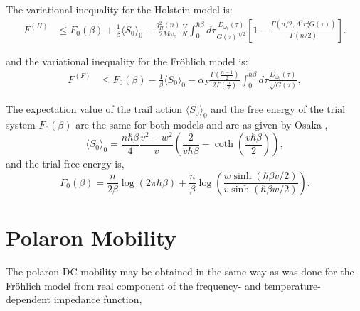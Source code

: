The variational inequality for the Holstein model is:
\begin{equation}
    \begin{aligned}
        F^{(H)} &\leq F_0(\beta) + \frac{1}{\beta} \langle S_0 \rangle_0 - \frac{g_H^2(n)}{2M\omega_0} \frac{V}{N} \int_0^{\hbar\beta} d\tau \frac{D_{\omega_0}(\tau)}{G(\tau)^{n/2}} \left[1 - \frac{\Gamma(n/2, \Lambda^2 r_p^2 G(\tau))}{\Gamma(n/2)}\right].
    \end{aligned}
\end{equation}

and the variational inequality for the Fr\"ohlich model is:
\begin{equation}
    \begin{aligned}
        F^{(F)} &\leq F_0(\beta) -\frac{1}{\beta} \langle S_0 \rangle_0 - \alpha_F \frac{\Gamma\left(\frac{n-1}{2}\right)}{2 \Gamma(\frac{n}{2})} \int_0^{\hbar\beta} d\tau \frac{D_{\omega_0}(\tau)}{\sqrt{G(\tau)}} ,
    \end{aligned}
\end{equation}

The expectation value of the trail action $\langle S_0 \rangle_0$ and the free energy of the trial system $F_0(\beta) $ are the same for both models and are as given by \=Osaka \cite{Osaka1959},
\begin{equation}
    \langle S_0 \rangle_0 = \frac{n\hbar\beta}{4} \frac{v^2-w^2}{v} \left(\frac{2}{v\hbar\beta} - \coth\left(\frac{v\hbar\beta}{2}\right)\right),
\end{equation}
and the trial free energy is,
\begin{equation}
    F_0(\beta) = \frac{n}{2\beta} \log\left(2\pi\hbar\beta\right) + \frac{n}{\beta} \log\left(\frac{w \sinh(\hbar\beta v / 2)}{v \sinh(\hbar\beta w / 2)}\right).
\end{equation}

\section{Polaron Mobility}

The polaron DC mobility may be obtained in the same way as was done for the Fr\"ohlich model from real component of the frequency- and temperature-dependent impedance function,

